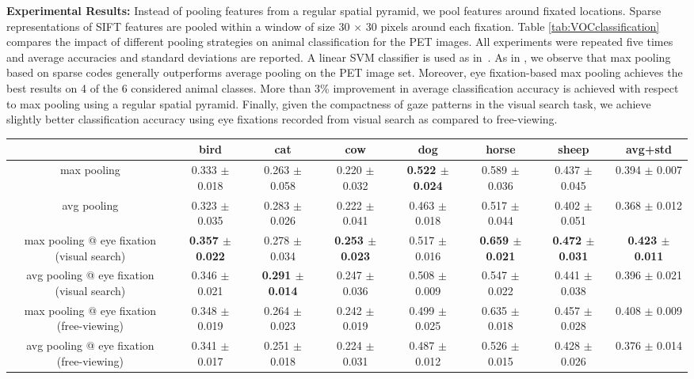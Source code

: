\documentclass{article}
\begin{document}
\textbf{Experimental Results:} Instead of pooling features from a regular spatial pyramid, we pool features around fixated locations. Sparse representations of SIFT features are pooled within a window of size 30 $\times$ 30 pixels around each fixation. Table \ref{tab:VOCclassification} compares the impact of different pooling strategies on animal classification for the PET images. All experiments were repeated five times and average accuracies and standard deviations are reported. A linear SVM classifier is used as in~\cite{Yang09CVPR}. As in \cite{Yang09CVPR}, we observe that max pooling based on sparse codes generally outperforms average pooling on the PET image set. Moreover, eye fixation-based max pooling achieves the best results on 4 of the 6 considered animal classes. More than 3\%  improvement in average classification accuracy is achieved with respect to max pooling using a regular spatial pyramid. Finally, given the compactness of gaze patterns in the visual search task, we achieve slightly better classification accuracy using eye fixations recorded from visual search as compared to free-viewing.
\begin{table*}[t]
\caption{Object classification accuracy with different pooling strategies on PET images.}
\label{tab:VOCclassification}
\centering
\vspace{-0.1in}
\resizebox{0.99\linewidth}{!} {
\begin{tabular}{|c||c|c|c|c|c|c||c|}
\hline
& bird & cat & cow & dog & horse & sheep & avg+std\\ \hline \hline
max pooling \cite{Yang09CVPR} & 0.333 $\pm$ 0.018 & 0.263 $\pm$ 0.058 & 0.220 $\pm$ 0.032 & \textbf{0.522 $\pm$ 0.024} & 0.589 $\pm$ 0.036 & 0.437 $\pm$ 0.045 & 0.394 $\pm$ 0.007 \\ \hline
avg pooling & 0.323 $\pm$ 0.035 & 0.283 $\pm$ 0.026 & 0.222 $\pm$ 0.041 & 0.463 $\pm$ 0.018 & 0.517 $\pm$ 0.044 & 0.402 $\pm$ 0.051 & 0.368 $\pm$ 0.012\\ \hline
max pooling @ eye fixation (visual search) & \textbf{0.357 $\pm$ 0.022} & 0.278 $\pm$ 0.034 & \textbf{0.253 $\pm$ 0.023} & 0.517 $\pm$ 0.016 & \textbf{0.659 $\pm$ 0.021} & \textbf{0.472 $\pm$ 0.031} & \textbf{0.423 $\pm$ 0.011} \\ \hline
avg pooling @ eye fixation (visual search) & 0.346 $\pm$ 0.021 & \textbf{0.291 $\pm$ 0.014} & 0.247 $\pm$ 0.036 & 0.508 $\pm$ 0.009 & 0.547 $\pm$ 0.022 & 0.441 $\pm$ 0.038 & 0.396 $\pm$ 0.021\\ \hline
max pooling @ eye fixation (free-viewing) & 0.348 $\pm$ 0.019 & 0.264 $\pm$ 0.023 & 0.242 $\pm$ 0.019 & 0.499 $\pm$ 0.025 & 0.635 $\pm$ 0.018 & 0.457 $\pm$ 0.028 & 0.408 $\pm$ 0.009 \\ \hline
avg pooling @ eye fixation (free-viewing) & 0.341 $\pm$ 0.017 & 0.251 $\pm$ 0.018 & 0.224 $\pm$ 0.031 & 0.487 $\pm$ 0.012 & 0.526 $\pm$ 0.015 & 0.428 $\pm$ 0.026 & 0.376 $\pm$ 0.014\\ \hline
\end{tabular}
}
\end{table*}
\end{document}
